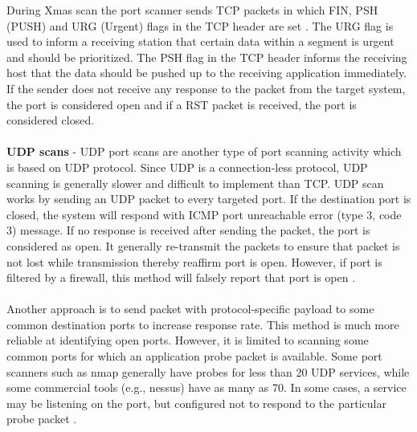     During Xmas scan the port scanner sends TCP packets in which FIN, PSH (PUSH) and URG (Urgent) flags in the TCP header are set \cite{port_techniques}.
    The URG flag is used to inform a receiving station that certain data within a segment is urgent and should be prioritized.
    The PSH flag in the TCP header informs the receiving host that the data should be pushed up to the receiving application immediately.
    If the sender does not receive any response to the packet from the target system, the port is considered open and if a RST packet is received, the port is considered closed.\\\\
    \textbf{UDP scans} - UDP port scans are another type of port scanning activity which is based on UDP protocol.
    Since UDP is a connection-less protocol, UDP scanning is generally slower and difficult to implement than TCP.
    UDP scan works by sending an UDP packet to every targeted port.
    If the destination port is closed, the system will respond with ICMP port unreachable error (type 3, code 3) message.
    If no response is received after sending the packet, the port is considered as open.
    It generally re-transmit the packets to ensure that packet is not lost while transmission thereby reaffirm port is open.
    However, if port is filtered by a firewall, this method will falsely report that port is open \cite{de1999review}.\\\\
    Another approach is to send packet with protocol-specific payload to some common destination ports to increase response rate.
    This method is much more reliable at identifying open ports.
    However, it is limited to scanning some common ports for which an application probe packet is available.
    Some port scanners such as nmap generally have probes for less than 20 UDP services, while some commercial tools (e.g., nessus) have as many as 70. In some cases, a service may be listening on the port, but configured not to respond to the particular probe packet \cite{port_techniques}. 
